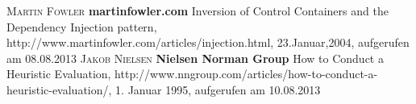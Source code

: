 \begin{thebibliography}{---}
                     \textsc{Martin Fowler}
                    \textbf{martinfowler.com}
      			Inversion of Control Containers and the Dependency Injection pattern, http://www.martinfowler.com/articles/injection.html, 23.Januar,2004, aufgerufen am 08.08.2013
                           \textsc{Jakob Nielsen}
                          \textbf{Nielsen Norman Group}
            			How to Conduct a Heuristic Evaluation, http://www.nngroup.com/articles/how-to-conduct-a-heuristic-evaluation/, 1. Januar 1995, aufgerufen am 10.08.2013
 
 
\end{thebibliography}

